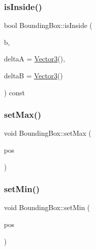 \mbox{\label{class_bounding_box_a7b9ce0524d009475a0616e96288b5f11}} 
\subsubsection{\texorpdfstring{is\+Inside()}{isInside()}}
{\footnotesize\ttfamily bool Bounding\+Box\+::is\+Inside (\begin{DoxyParamCaption}\item[{const \hyperlink{class_bounding_box}{Bounding\+Box}}]{b,  }\item[{\hyperlink{class_vector3}{Vector3}}]{deltaA = {\ttfamily \hyperlink{class_vector3}{Vector3}()},  }\item[{\hyperlink{class_vector3}{Vector3}}]{deltaB = {\ttfamily \hyperlink{class_vector3}{Vector3}()} }\end{DoxyParamCaption}) const\hspace{0.3cm}{\ttfamily [inline]}}

\mbox{\label{class_bounding_box_aa219028cad7432dcee337418bc4af118}} 
\subsubsection{\texorpdfstring{set\+Max()}{setMax()}}
{\footnotesize\ttfamily void Bounding\+Box\+::set\+Max (\begin{DoxyParamCaption}\item[{\hyperlink{class_vector3}{Vector3}}]{pos }\end{DoxyParamCaption})\hspace{0.3cm}{\ttfamily [inline]}}

\mbox{\label{class_bounding_box_a49c72d3d0840294305fbf498050147db}} 
\subsubsection{\texorpdfstring{set\+Min()}{setMin()}}
{\footnotesize\ttfamily void Bounding\+Box\+::set\+Min (\begin{DoxyParamCaption}\item[{\hyperlink{class_vector3}{Vector3}}]{pos }\end{DoxyParamCaption})\hspace{0.3cm}{\ttfamily [inline]}}



